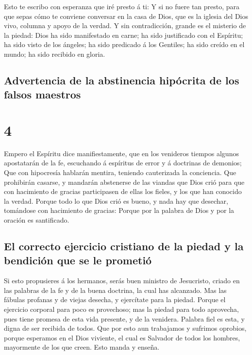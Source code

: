  Esto te escribo con esperanza que iré presto á ti:
 Y si no fuere tan presto, para que sepas cómo te
conviene conversar en la casa de Dios, que es la iglesia del Dios vivo,
columna y apoyo de la verdad.  Y sin contradicción,
grande es el misterio de la piedad: Dios ha sido manifestado en carne;
ha sido justificado con el Espíritu; ha sido visto de los ángeles; ha
sido predicado á los Gentiles; ha sido creído en el mundo; ha sido
recibido en gloria.

\hypertarget{advertencia-de-la-abstinencia-hipuxf3crita-de-los-falsos-maestros}{%
\subsection{Advertencia de la abstinencia hipócrita de los falsos
maestros}\label{advertencia-de-la-abstinencia-hipuxf3crita-de-los-falsos-maestros}}

\hypertarget{section-54-4}{%
\section{4}\label{section-54-4}}

 Empero el Espíritu dice manifiestamente, que en los
venideros tiempos algunos apostatarán de la fe, escuchando á espíritus
de error y á doctrinas de demonios;  Que con hipocresía
hablarán mentira, teniendo cauterizada la conciencia.  Que
prohibirán casarse, y mandarán abstenerse de las viandas que Dios crió
para que con hacimiento de gracias participasen de ellas los fieles, y
los que han conocido la verdad.  Porque todo lo que Dios
crió es bueno, y nada hay que desechar, tomándose con hacimiento de
gracias:  Porque por la palabra de Dios y por la oración
es santificado.

\hypertarget{el-correcto-ejercicio-cristiano-de-la-piedad-y-la-bendiciuxf3n-que-se-le-prometiuxf3}{%
\subsection{El correcto ejercicio cristiano de la piedad y la bendición
que se le
prometió}\label{el-correcto-ejercicio-cristiano-de-la-piedad-y-la-bendiciuxf3n-que-se-le-prometiuxf3}}

 Si esto propusieres á los hermanos, serás buen ministro
de Jesucristo, criado en las palabras de la fe y de la buena doctrina,
la cual has alcanzado.  Mas las fábulas profanas y de
viejas desecha, y ejercítate para la piedad.  Porque el
ejercicio corporal para poco es provechoso; mas la piedad para todo
aprovecha, pues tiene promesa de esta vida presente, y de la venidera.
 Palabra fiel es esta, y digna de ser recibida de todos.
 Que por esto aun trabajamos y sufrimos oprobios, porque
esperamos en el Dios viviente, el cual es Salvador de todos los hombres,
mayormente de los que creen.  Esto manda y enseña.


